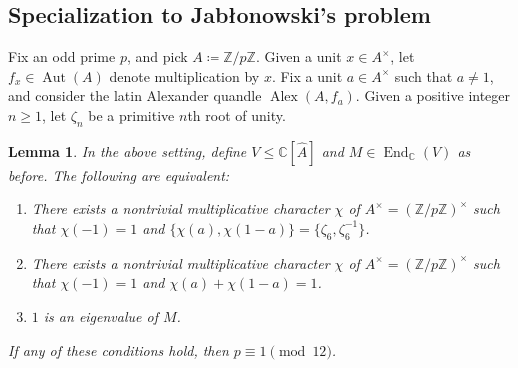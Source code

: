 \documentclass[12pt]{amsart}
\newtheorem{lem}[thm]{Lemma}
\theoremstyle{definition}
\theoremstyle{remark}
\newcommand{\C}{\mathbb{C}}
\newcommand{\Z}{\mathbb{Z}}
\newcommand{\A}{\widehat{A}}
\newcommand{\inv}{^{-1}}
\def\Aut{\operatorname{Aut}}
\def\End{\operatorname{End}}
\def\Alex{\operatorname{Alex}}
\begin{document}
\subsection{Specialization to Jab\l onowski's problem}

Fix an odd prime $p$, and pick $A\coloneq\Z/p\Z$. Given a unit $x\in A^\times$, let $f_x\in\Aut(A)$ denote multiplication by $x$. Fix a unit $a\in A^\times$ such that $a\neq 1$, and consider the latin Alexander quandle $\Alex(A,f_a)$. Given a positive integer $n\geq 1$, let $\zeta_n$ be a primitive $n$th root of unity.

\begin{lem}\label{lem:characters}
    In the above setting, define $V\leq\C[\A]$ and $M\in\End_\C(V)$ as before. The following are equivalent:
    \begin{enumerate}
        \item There exists a nontrivial multiplicative character $\chi$ of $A^\times=(\Z/p\Z)^\times$ such that $\chi(-1)=1$ and $\{\chi(a),\chi(1-a)\}=\{\zeta_6,\zeta_6\inv\}$.
        \item There exists a nontrivial multiplicative character $\chi$ of $A^\times=(\Z/p\Z)^\times$ such that $\chi(-1)=1$ and $\chi(a)+\chi(1-a)=1$.
        \item $1$ is an eigenvalue of $M$.
    \end{enumerate}
    If any of these conditions hold, then $p\equiv 1\pmod{12}$.
\end{lem}
\end{document}
